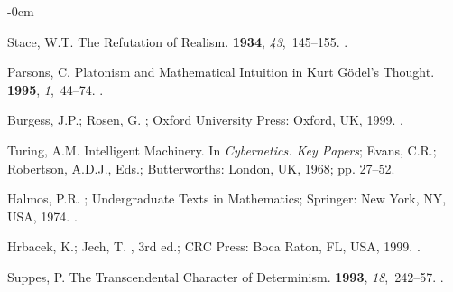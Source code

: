 \documentclass[axioms,article,accept,oneauthor,pdftex]{Definitions/mdpi}
\begin{document}
\begin{adjustwidth}{-\extralength}{0cm}




\begin{thebibliography}{999}

Stace, W.T.
\newblock The Refutation of Realism.
 {\bf 1934}, {\em 43},~145--155.
.

Parsons, C.
\newblock Platonism and Mathematical Intuition in {K}urt {G}\"odel's Thought.
 {\bf 1995}, {\em 1},~44--74.
.

Burgess, J.P.; Rosen, G.
; Oxford University Press: Oxford, UK,  1999.
.

Turing, A.M.
\newblock Intelligent Machinery. In {\em {C}ybernetics. {K}ey Papers}; Evans,
  C.R.; Robertson, A.D.J., Eds.; Butterworths: London, UK, 1968; pp. 27--52.

Halmos, P.R.
; Undergraduate Texts in Mathematics; Springer:
  New York, NY, USA,  1974.
.

Hrbacek, K.; Jech, T.
, 3rd ed.; {CRC} Press:  Boca Raton, FL, USA,
1999.
.

Suppes, P.
\newblock The Transcendental Character of Determinism.
 {\bf 1993}, {\em 18},~242--57.
.


\end{thebibliography}
\end{adjustwidth}
\end{document}
